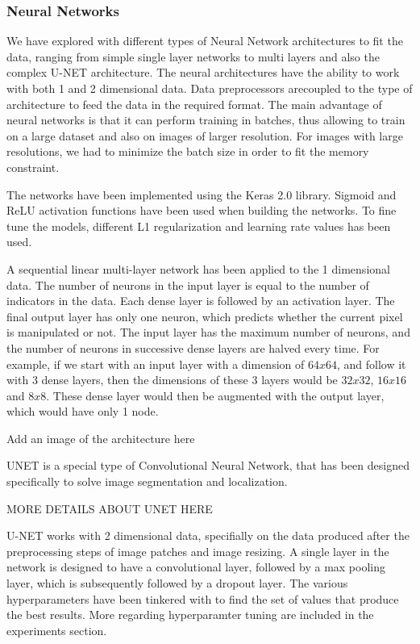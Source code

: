 \subsubsection{Neural Networks}

We have explored with different types of Neural Network architectures to fit the data, ranging from simple single layer networks to multi layers and also the 
complex U-NET architecture. The neural architectures have the ability to work with both
1 and 2 dimensional data. Data preprocessors arecoupled to the type of architecture to feed the data in the required format. The main advantage 
of neural networks is that it can perform training in batches, thus allowing to train on a large dataset and also on images of larger resolution. For images 
with large resolutions, we had to minimize the batch size in order to fit the memory constraint.

The networks have been implemented using the Keras 2.0 library. Sigmoid and ReLU activation functions have been used when building the networks. 
To fine tune the models, different L1 regularization and learning rate values has been used.


A sequential linear multi-layer network has been applied to the 1 dimensional data. The number of neurons in the input layer is equal to the number of 
indicators in the data. Each dense layer is followed by an activation layer. The final output layer has only one neuron, which predicts whether the current
pixel is manipulated or not. The input layer has the maximum number of neurons, and the number of neurons in successive dense layers are halved every time. 
For example, if we start with an input layer with a dimension of $64x64$, and follow it with 3 dense layers, then the dimensions of these 3 layers would be 
$32x32$, $16x16$ and $8x8$. These dense layer would then be augmented with the output layer, which would have only 1 node.

Add an image of the architecture here



UNET is a special type of Convolutional Neural Network, that has been designed specifically to solve image segmentation and localization. 

MORE DETAILS ABOUT UNET HERE 


U-NET works with 2 dimensional data, specifially on the data produced after the preprocessing steps of image patches 
and image resizing. A single layer in the network is designed to have a convolutional layer, followed by a max pooling layer, which is subsequently 
followed by a dropout layer. The various hyperparameters have been tinkered with to find the set of values that produce the best results. More regarding 
hyperparamter tuning are included in the experiments section.



